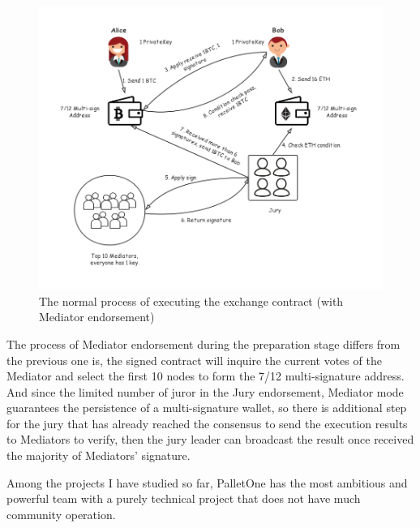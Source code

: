\begin{figure}[H]
    \includegraphics[width=1\textwidth]{./figures/mediator.png}
    \centering
    \caption{The normal process of executing the exchange contract (with Mediator endorsement) \protect\footnotemark}
    \label{fig:mediator}
    \centering
\end{figure}
\noindent The process of Mediator endorsement during the preparation stage differs from the previous one is, the signed contract will inquire the current votes of the Mediator and select the first 10 nodes to form the 7/12 multi-signature address. And since the limited number of juror in the Jury endorsement, Mediator mode guarantees the persistence of a multi-signature wallet, so there is additional step for the jury that has already reached the consensus to send the execution results to Mediators to verify, then the jury leader can broadcast the result once received the majority of Mediators' signature.

\noindent Among the projects I have studied so far, PalletOne has the most ambitious and powerful team with a purely technical project that does not have much community operation.

